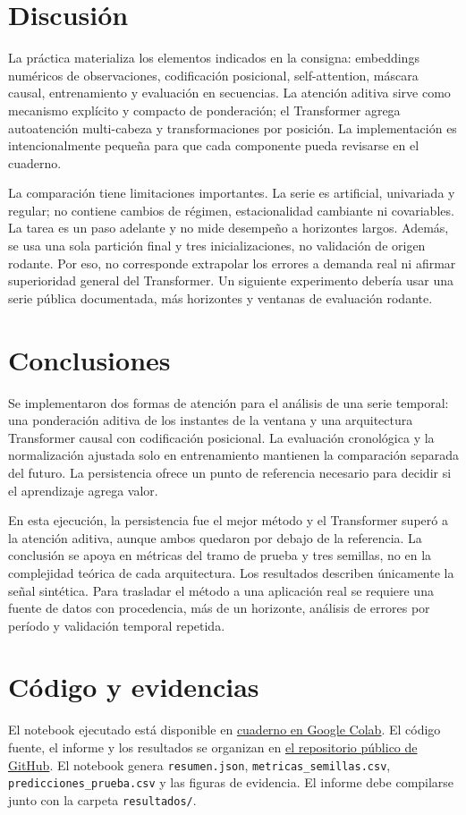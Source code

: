 \documentclass[12pt]{article}
\newcommand{\repo}{\href{https://github.com/Salv4tore27/carlos-transformers-series-tiempo-73437}{el repositorio público de GitHub}}
\newcommand{\colab}{\href{https://colab.research.google.com/github/Salv4tore27/carlos-transformers-series-tiempo-73437/blob/main/Carlos_Transformers_Series_Tiempo.ipynb}{cuaderno en Google Colab}}
\begin{document}
\section{Discusión}
La práctica materializa los elementos indicados en la consigna: embeddings numéricos de observaciones, codificación posicional, self-attention, máscara causal, entrenamiento y evaluación en secuencias. La atención aditiva sirve como mecanismo explícito y compacto de ponderación; el Transformer agrega autoatención multi-cabeza y transformaciones por posición. La implementación es intencionalmente pequeña para que cada componente pueda revisarse en el cuaderno.

La comparación tiene limitaciones importantes. La serie es artificial, univariada y regular; no contiene cambios de régimen, estacionalidad cambiante ni covariables. La tarea es un paso adelante y no mide desempeño a horizontes largos. Además, se usa una sola partición final y tres inicializaciones, no validación de origen rodante. Por eso, no corresponde extrapolar los errores a demanda real ni afirmar superioridad general del Transformer. Un siguiente experimento debería usar una serie pública documentada, más horizontes y ventanas de evaluación rodante.

\section{Conclusiones}
Se implementaron dos formas de atención para el análisis de una serie temporal: una ponderación aditiva de los instantes de la ventana y una arquitectura Transformer causal con codificación posicional. La evaluación cronológica y la normalización ajustada solo en entrenamiento mantienen la comparación separada del futuro. La persistencia ofrece un punto de referencia necesario para decidir si el aprendizaje agrega valor.

En esta ejecución, la persistencia fue el mejor método y el Transformer superó a la atención aditiva, aunque ambos quedaron por debajo de la referencia. La conclusión se apoya en métricas del tramo de prueba y tres semillas, no en la complejidad teórica de cada arquitectura. Los resultados describen únicamente la señal sintética. Para trasladar el método a una aplicación real se requiere una fuente de datos con procedencia, más de un horizonte, análisis de errores por período y validación temporal repetida.

\section*{Código y evidencias}
El notebook ejecutado está disponible en \colab. El código fuente, el informe y los resultados se organizan en \repo. El notebook genera \texttt{resumen.json}, \texttt{metricas\_semillas.csv}, \texttt{predicciones\_prueba.csv} y las figuras de evidencia. El informe debe compilarse junto con la carpeta \texttt{resultados/}.
\end{document}

